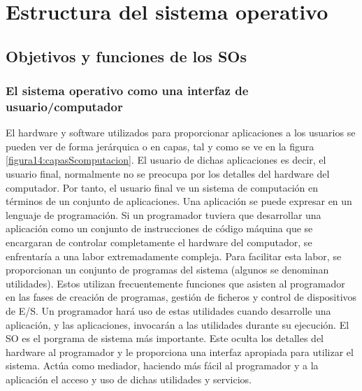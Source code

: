 \documentclass{article}
\begin{document}
				
				\section{Estructura del sistema operativo}	
					\subsection{Objetivos y funciones de los SOs}
						\subsubsection{El sistema operativo como una interfaz de usuario/computador}
						El hardware y software utilizados para proporcionar aplicaciones a los usuarios se pueden ver de forma jerárquica o en capas, tal y como	se ve en la figura \ref{figura14:capasScomputacion}. El usuario de dichas aplicaciones es decir, el usuario final, normalmente no se preocupa por los detalles del hardware del computador. Por tanto, el usuario final ve un sistema de computación en términos de un conjunto de aplicaciones. Una aplicación se puede expresar en un lenguaje de programación. Si un programador tuviera que desarrollar una aplicación como un conjunto de instrucciones de código máquina que se encargaran de controlar completamente el hardware del computador, se enfrentaría a una labor extremadamente compleja. Para facilitar esta labor, se proporcionan un conjunto de programas del sistema (algunos se denominan utilidades). Estos utilizan frecuentemente funciones que asisten al programador en las fases de creación de programas, gestión de ficheros y control de dispositivos de E/S. Un programador hará uso de estas utilidades cuando desarrolle una aplicación, y las aplicaciones, invocarán a las utilidades durante su ejecución. El SO es el porgrama de sistema más importante. Este oculta los detalles del hardware al programador y le proporciona una interfaz apropiada para utilizar el sistema. Actúa como mediador, haciendo más fácil al programador y a la aplicación el acceso y uso de dichas utilidades y servicios.
						
\end{document}
